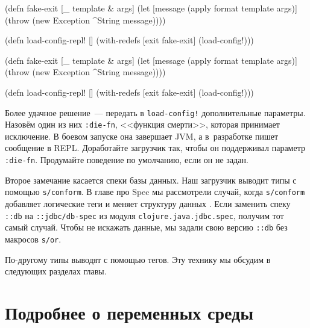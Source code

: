 \ifx\DEVICETYPE\MOBILE


\begin{english}
  \begin{clojure}
(defn fake-exit
  [_ template & args]
  (let [message (apply format template args)]
    (throw (new Exception ^String message))))

(defn load-config-repl! []
  (with-redefs [exit fake-exit]
    (load-config!)))
  \end{clojure}
\end{english}

\else

\begin{english}
  \begin{clojure}
(defn fake-exit
  [_ template & args]
  (let [message (apply format template args)]
    (throw (new Exception ^String message))))

(defn load-config-repl! []
  (with-redefs [exit fake-exit]
    (load-config!)))
  \end{clojure}
\end{english}

\fi


Более удачное решение~--- передать в \texttt{load-con\-fig!} дополнительные
параметры. Назовём один из них \verb|:die-fn|, <<функция смерти>>, которая
принимает исключение. В боевом запуске она завершает JVM, а в~разработке пишет
сообщение в REPL. Доработайте загрузчик так, чтобы он поддерживал параметр
\verb|:die-fn|. Продумайте поведение по умолчанию, если он не задан.

Второе замечание касается спеки базы данных. Наш загрузчик выводит типы с
помощью \verb|s/conform|. В главе про Spec мы рассмотрели случай, когда
\verb|s/conform| добавляет логические теги и меняет структуру
данных . Если заменить спеку \verb|::db| на
\verb|::jdbc/db-spec| из модуля \texttt{clojure.java.jdbc.spec}, получим тот
самый случай. Чтобы не искажать данные, мы задали свою версию \verb|::db| без
макросов \verb|s/or|.


По-другому типы выводят с помощью тегов. Эту технику мы обсудим в следующих
разделах главы.

\section{Подробнее о переменных среды}

